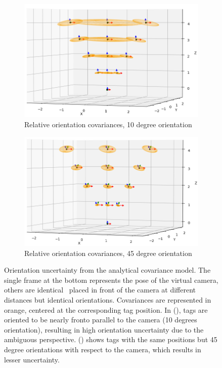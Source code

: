 \begin{figure}[h]
    \centering
    \begin{subfigure}{.50\linewidth}
        \centering
        \includegraphics[width=\textwidth]{figures/apriltag_cov_O_10deg.png}
        \caption{Relative orientation covariances, 10 degree orientation \label{fig:apriltag_cov_O_10deg}}
    \end{subfigure}%
    \hfill
    \begin{subfigure}{.50\linewidth}
        \centering
        \includegraphics[width=\textwidth]{figures/apriltag_cov_O_45deg.png}
        \caption{Relative orientation covariances, 45 degree orientation \label{fig:apriltag_cov_O_45deg}}
    \end{subfigure}%
    \caption{Orientation uncertainty from the analytical covariance model. The single frame at the bottom represents the pose of the virtual camera, others are identical 
    \apriltags\ placed in front of the camera at different distances but identical orientations. Covariances are represented in orange, centered at the corresponding tag 
    position.
    In (), tags are oriented to be nearly fronto parallel to the camera (10 degrees orientation), resulting in high orientation uncertainty due to the ambiguous perspective. 
    () shows tags with the same positions but 45 degree orientations with respect to the camera, which results in lesser uncertainty.}
    \label{fig:apriltag_cov_O}
\end{figure}


